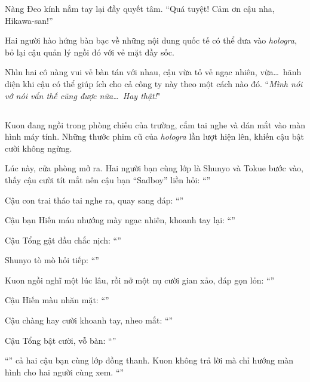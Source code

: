 \documentclass[../main.tex]{subfiles}
\begin{document}
Nàng Đeo kính nắm tay lại đầy quyết tâm. ``Quá tuyệt! Cảm ơn cậu nha, Hikawa-san!''

Hai người hào hứng bàn bạc về những nội dung quốc tế có thể đưa vào \textit{hologra}, bỏ lại cậu quản lý ngồi đó với vẻ mặt đầy sốc.

Nhìn hai cô nàng vui vẻ bàn tán với nhau, cậu vừa tỏ vẻ ngạc nhiên, vừa\dots\ hãnh diện khi cậu có thể giúp ích cho cả công ty này theo một cách nào đó. ``\textit{Mình nói vớ nói vẩn thế cũng được nữa\dots\ Hay thật!}"

\subsection*{\label{ep-S13.X}}

Kuon đang ngồi trong phòng chiếu của trường, cắm tai nghe và dán mắt vào màn hình máy tính. Những thước phim cũ của \textit{hologra} lần lượt hiện lên, khiến cậu bật cười không ngừng.

Lúc này, cửa phòng mở ra. Hai người bạn cùng lớp là Shunyo và Tokue bước vào, thấy cậu cười tít mắt nên cậu bạn ``Sadboy'' liền hỏi: ``''

Cậu con trai tháo tai nghe ra, quay sang đáp: ``''

Cậu bạn Hiến máu nhướng mày ngạc nhiên, khoanh tay lại: ``''

Cậu Tổng gật đầu chắc nịch: ``''

Shunyo tò mò hỏi tiếp: ``''

Kuon ngồi nghĩ một lúc lâu, rồi nở một nụ cười gian xảo, đáp gọn lỏn: ``''

Cậu Hiến màu nhăn mặt: ``''

Cậu chàng hay cười khoanh tay, nheo mắt: ``''

Cậu Tổng bật cười, vỗ bàn: ``''

``'' cả hai cậu bạn cùng lớp đồng thanh. Kuon không trả lời mà chỉ hướng màn hình cho hai người cùng xem. ``''
\end{document}

